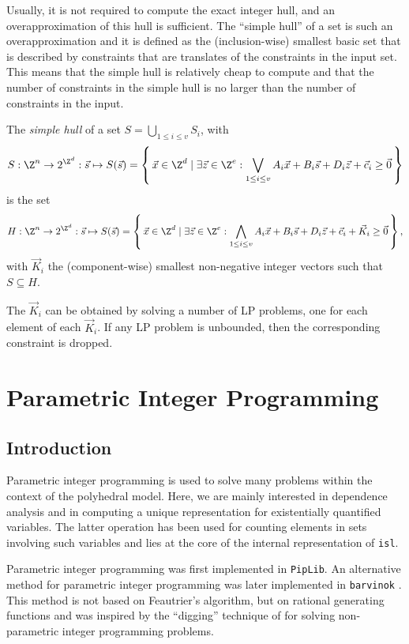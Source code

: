 Usually, it is not required to compute the exact integer hull,
and an overapproximation of this hull is sufficient.
The ``simple hull'' of a set is such an overapproximation
and it is defined as the (inclusion-wise) smallest basic set
that is described by constraints that are translates of
the constraints in the input set.
This means that the simple hull is relatively cheap to compute
and that the number of constraints in the simple hull is no
larger than the number of constraints in the input.
\begin{definition}
The {\em simple hull} of a set
$S = \bigcup_{1 \le i \le v} S_i$, with
$$
S : \Z^n \to 2^{\Z^d} : \vec s \mapsto
S(\vec s) =
\left\{\, \vec x \in \Z^d \mid \exists \vec z \in \Z^e :
\bigvee_{1 \le i \le v}
A_i \vec x + B_i \vec s + D_i \vec z + \vec c_i \geq \vec 0 \,\right\}
$$
is the set
$$
H : \Z^n \to 2^{\Z^d} : \vec s \mapsto
S(\vec s) =
\left\{\, \vec x \in \Z^d \mid \exists \vec z \in \Z^e :
\bigwedge_{1 \le i \le v}
A_i \vec x + B_i \vec s + D_i \vec z + \vec c_i + \vec K_i \geq \vec 0
\,\right\}
,
$$
with $\vec K_i$ the (component-wise) smallest non-negative integer vectors
such that $S \subseteq H$.
\end{definition}
The $\vec K_i$ can be obtained by solving a number of
LP problems, one for each element of each $\vec K_i$.
If any LP problem is unbounded, then the corresponding constraint
is dropped.

\section{Parametric Integer Programming}

\subsection{Introduction}\label{s:intro}

Parametric integer programming 
is used to solve many problems within the context of the polyhedral model.
Here, we are mainly interested in dependence analysis 
and in computing a unique representation for existentially quantified
variables.  The latter operation has been used for counting elements
in sets involving such variables
 and lies at the core
of the internal representation of {\tt isl}.

Parametric integer programming was first implemented in \texttt{PipLib}.
An alternative method for parametric integer programming
was later implemented in {\tt barvinok} \cite{barvinok-0.22}.
This method is not based on Feautrier's algorithm, but on rational
generating functions \cite{Woods2003short} and was inspired by the
``digging'' technique of  for solving
non-parametric integer programming problems.

